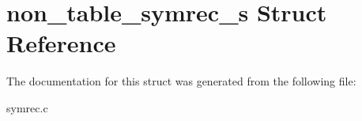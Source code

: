 \hypertarget{structnon__table__symrec__s}{\section{non\-\_\-table\-\_\-symrec\-\_\-s Struct Reference}
\label{structnon__table__symrec__s}
}


The documentation for this struct was generated from the following file\-:\begin{DoxyCompactItemize}
\item 
symrec.\-c\end{DoxyCompactItemize}
